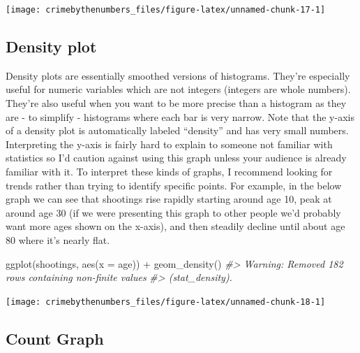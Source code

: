 \documentclass[
]{krantz}
\makeatletter
\newenvironment{Shaded}{\begin{snugshade}}{\end{snugshade}}
\newcommand{\AttributeTok}[1]{\textcolor[rgb]{0.61,0.61,0.61}{#1}}
\newcommand{\CommentTok}[1]{\textcolor[rgb]{0.37,0.37,0.37}{\textit{#1}}}
\newcommand{\FunctionTok}[1]{\textcolor[rgb]{0,0,0}{#1}}
\newcommand{\NormalTok}[1]{#1}
\newcommand{\SpecialCharTok}[1]{\textcolor[rgb]{0,0,0}{#1}}
\newenvironment{kframe}{%
\medskip{}
\setlength{\fboxsep}{.8em}
 \def\at@end@of@kframe{}%
 \ifinner\ifhmode%
  \def\at@end@of@kframe{\end{minipage}}%
  \begin{minipage}{\columnwidth}%
 \fi\fi%
 \def\FrameCommand##1{\hskip\@totalleftmargin \hskip-\fboxsep
 \colorbox{shadecolor}{##1}\hskip-\fboxsep
     \hskip-\linewidth \hskip-\@totalleftmargin \hskip\columnwidth}%
 \MakeFramed {\advance\hsize-\width
   \@totalleftmargin\z@ \linewidth\hsize
   \@setminipage}}%
 {\par\unskip\endMakeFramed%
 \at@end@of@kframe}
\renewenvironment{Shaded}{\begin{kframe}}{\end{kframe}}
\makeatother
\begin{document}
\begin{center}\texttt{[image: crimebythenumbers\_files/figure-latex/unnamed-chunk-17-1]} \end{center}

\hypertarget{density-plot}{%
\subsection{Density plot}\label{density-plot}}

Density plots are essentially smoothed versions of histograms. They're especially useful for numeric variables which are not integers (integers are whole numbers). They're also useful when you want to be more precise than a histogram as they are - to simplify - histograms where each bar is very narrow. Note that the y-axis of a density plot is automatically labeled ``density'' and has very small numbers. Interpreting the y-axis is fairly hard to explain to someone not familiar with statistics so I'd caution against using this graph unless your audience is already familiar with it. To interpret these kinds of graphs, I recommend looking for trends rather than trying to identify specific points. For example, in the below graph we can see that shootings rise rapidly starting around age 10, peak at around age 30 (if we were presenting this graph to other people we'd probably want more ages shown on the x-axis), and then steadily decline until about age 80 where it's nearly flat.

\begin{Shaded}
\begin{Highlighting}[]
\FunctionTok{ggplot}\NormalTok{(shootings, }\FunctionTok{aes}\NormalTok{(}\AttributeTok{x =}\NormalTok{ age)) }\SpecialCharTok{+} 
  \FunctionTok{geom\_density}\NormalTok{()}
\CommentTok{\#\textgreater{} Warning: Removed 182 rows containing non{-}finite values}
\CommentTok{\#\textgreater{} (stat\_density).}
\end{Highlighting}
\end{Shaded}

\begin{center}\texttt{[image: crimebythenumbers\_files/figure-latex/unnamed-chunk-18-1]} \end{center}

\hypertarget{count-graph}{%
\subsection{Count Graph}\label{count-graph}}
\end{document}
